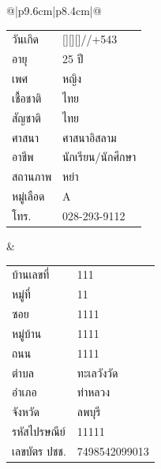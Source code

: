 \documentclass[12pt]{article}
\newcommand{\bedate}[1]{\StrLeft{#1}{4}[\yy]\StrMid{#1}{6}{7}[\mm]\StrMid{#1}{9}{10}[\dd]\dd/\mm/\the\numexpr\yy+543\relax}
\begin{document}
\renewcommand{\arraystretch}{1.3}
\begin{tabular}{@{}|p{9.6cm}|p{8.4cm}|@{}}\hline
{}\\ \hline
\begin{tabular}[t]{@{}ll@{}}
 วันเกิด & \bedate{2001-06-28}\\ อายุ & 25 ปี\\
 เพศ & หญิง\\
 เชื้อชาติ & ไทย\\ สัญชาติ & ไทย\\ ศาสนา & ศาสนาอิสลาม\\
 อาชีพ & นักเรียน/นักศึกษา\\ สถานภาพ & หย่า\\
 หมู่เลือด & A\\
 โทร. & 028-293-9112\\
\end{tabular}
&
\begin{tabular}[t]{@{}ll@{}}
 บ้านเลขที่ & 111\\ หมู่ที่ & 11\\ ซอย & 1111\\
 หมู่บ้าน & 1111\\ ถนน & 1111\\ ตำบล & ทะเลวังวัด\\
 อำเภอ & ท่าหลวง\\ จังหวัด & ลพบุรี\\ รหัสไปรษณีย์ & 11111\\
 เลขบัตร ปชช. & 7498542099013\\
\end{tabular}\\ \hline
{}\\ \hline
{}\\ \hline
\end{tabular}
\end{document}
